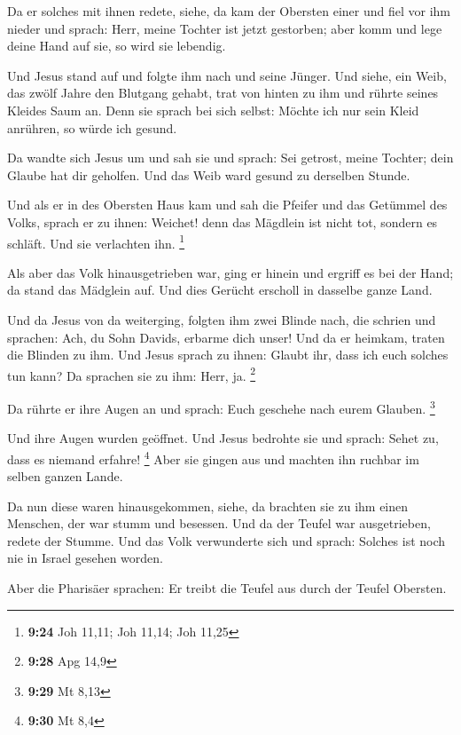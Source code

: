  Da er solches mit ihnen redete, siehe, da kam der Obersten
einer und fiel vor ihm nieder und sprach: Herr, meine Tochter ist jetzt
gestorben; aber komm und lege deine Hand auf sie, so wird sie lebendig.

 Und Jesus stand auf und folgte ihm nach und seine Jünger.
 Und siehe, ein Weib, das zwölf Jahre den Blutgang gehabt,
trat von hinten zu ihm und rührte seines Kleides Saum an. 
Denn sie sprach bei sich selbst: Möchte ich nur sein Kleid anrühren, so
würde ich gesund.

 Da wandte sich Jesus um und sah sie und sprach: Sei
getrost, meine Tochter; dein Glaube hat dir geholfen. Und das Weib ward
gesund zu derselben Stunde.

 Und als er in des Obersten Haus kam und sah die Pfeifer
und das Getümmel des Volks,  sprach er zu ihnen: Weichet!
denn das Mägdlein ist nicht tot, sondern es schläft. Und sie verlachten
ihn. \footnote{\textbf{9:24} Joh 11,11; Joh 11,14; Joh 11,25}

 Als aber das Volk hinausgetrieben war, ging er hinein und
ergriff es bei der Hand; da stand das Mädglein auf.  Und
dies Gerücht erscholl in dasselbe ganze Land.

 Und da Jesus von da weiterging, folgten ihm zwei Blinde
nach, die schrien und sprachen: Ach, du Sohn Davids, erbarme dich unser!
 Und da er heimkam, traten die Blinden zu ihm. Und Jesus
sprach zu ihnen: Glaubt ihr, dass ich euch solches tun kann? Da sprachen
sie zu ihm: Herr, ja. \footnote{\textbf{9:28} Apg 14,9}

 Da rührte er ihre Augen an und sprach: Euch geschehe nach
eurem Glauben. \footnote{\textbf{9:29} Mt 8,13}

 Und ihre Augen wurden geöffnet. Und Jesus bedrohte sie und
sprach: Sehet zu, dass es niemand erfahre! \footnote{\textbf{9:30} Mt
  8,4}  Aber sie gingen aus und machten ihn ruchbar im
selben ganzen Lande.

 Da nun diese waren hinausgekommen, siehe, da brachten sie
zu ihm einen Menschen, der war stumm und besessen.  Und da
der Teufel war ausgetrieben, redete der Stumme. Und das Volk verwunderte
sich und sprach: Solches ist noch nie in Israel gesehen worden.

 Aber die Pharisäer sprachen: Er treibt die Teufel aus
durch der Teufel Obersten.

